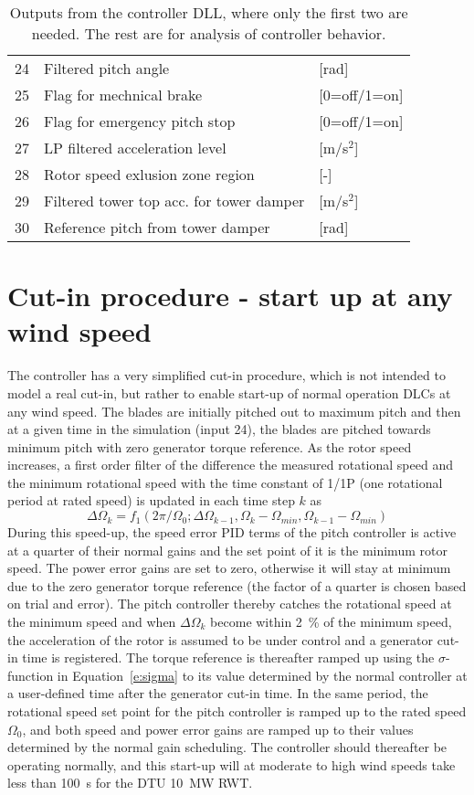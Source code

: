 \begin{table}[t]
\begin{tabular}{r|ll}
24& Filtered pitch angle                    & [rad]\\
25& Flag for mechnical brake                & [0=off/1=on]\\
26& Flag for emergency pitch stop           & [0=off/1=on]\\
27& LP filtered acceleration level          & [m/s${}^2$]\\
28& Rotor speed exlusion zone region        & [-]\\
29& Filtered tower top acc. for tower damper &[m/s${}^2$]\\
30& Reference pitch from tower damper       & [rad]\\
\end{tabular}
\caption{Outputs from the controller DLL, where only the first two are needed. The rest are for analysis of controller behavior.  \label{t:output}}
\end{table}

\section{Cut-in procedure - start up at any wind speed}

The controller has a very simplified cut-in procedure, which is not intended to model a real cut-in, but rather to enable start-up of normal operation DLCs at any wind speed. The blades are initially pitched out to maximum pitch and then at a given time in the simulation (input 24), the blades are pitched towards minimum pitch with zero generator torque reference. As the rotor speed increases, a first order filter of the difference the measured rotational speed and the minimum rotational speed with the time constant of 1/1P (one rotational period at rated speed) is updated in each time step $k$ as
\begin{equation}
\label{e:speedtrack}
\Delta \Omega_k = f_1 \left(2\pi/\Omega_0; \Delta \Omega_{k-1} , \Omega_{k}-\Omega_{min} , \Omega_{k-1}-\Omega_{min}\right)
\end{equation}
During this speed-up, the speed error PID terms of the pitch controller is active at a quarter of their normal gains and the set point of it is the minimum rotor speed. The power error gains are set to zero, otherwise it will stay at minimum due to the zero generator torque reference (the factor of a quarter is chosen based on trial and error). The pitch controller thereby catches the rotational speed at the minimum speed and when $\Delta \Omega_k$ become within 2~\% of the minimum speed, the acceleration of the rotor is assumed to be under control and a generator cut-in time is registered. The torque reference is thereafter ramped up using the $\sigma$-function in Equation~\eqref{e:sigma} to its value determined by the normal controller at a user-defined time after the generator cut-in time. In the same period, the rotational speed set point for the pitch controller is ramped up to the rated speed $\Omega_0$, and both speed and power error gains are ramped up to their values determined by the normal gain scheduling. The controller should thereafter be operating normally, and this start-up will at moderate to high wind speeds take less than 100~s for the DTU 10~MW RWT.


